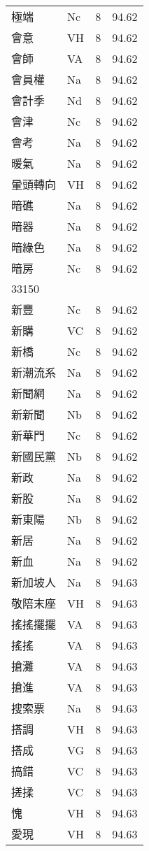 \documentclass[twocolumn]{book}
\begin{document}
\begin{supertabular}{llrr}
極端 & Nc & 8 &  94.62\\
會意 & VH & 8 &  94.62\\
會師 & VA & 8 &  94.62\\
會員權 & Na & 8 &  94.62\\
會計季 & Nd & 8 &  94.62\\
會津 & Nc & 8 &  94.62\\
會考 & Na & 8 &  94.62\\
暖氣 & Na & 8 &  94.62\\
暈頭轉向 & VH & 8 &  94.62\\
暗礁 & Na & 8 &  94.62\\
暗器 & Na & 8 &  94.62\\
暗綠色 & Na & 8 &  94.62\\
暗房 & Nc & 8 &  94.62\\
33150\\
新豐 & Nc & 8 &  94.62\\
新購 & VC & 8 &  94.62\\
新橋 & Nc & 8 &  94.62\\
新潮流系 & Na & 8 &  94.62\\
新聞網 & Na & 8 &  94.62\\
新新聞 & Nb & 8 &  94.62\\
新華門 & Nc & 8 &  94.62\\
新國民黨 & Nb & 8 &  94.62\\
新政 & Na & 8 &  94.62\\
新股 & Na & 8 &  94.62\\
新東陽 & Nb & 8 &  94.62\\
新居 & Na & 8 &  94.62\\
新血 & Na & 8 &  94.62\\
新加坡人 & Na & 8 &  94.63\\
敬陪末座 & VH & 8 &  94.63\\
搖搖擺擺 & VA & 8 &  94.63\\
搖搖 & VA & 8 &  94.63\\
搶灘 & VA & 8 &  94.63\\
搶進 & VA & 8 &  94.63\\
搜索票 & Na & 8 &  94.63\\
搭調 & VH & 8 &  94.63\\
搭成 & VG & 8 &  94.63\\
搞錯 & VC & 8 &  94.63\\
搓揉 & VC & 8 &  94.63\\
愧 & VH & 8 &  94.63\\
愛現 & VH & 8 &  94.63\\

\end{supertabular}
\end{document}
